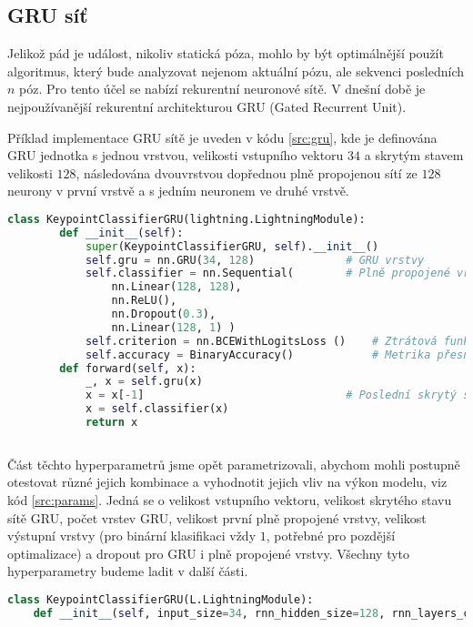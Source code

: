 \subsection{GRU síť}

Jelikož pád je událost, nikoliv statická póza, mohlo by být optimálnější použít
algoritmus, který bude analyzovat nejenom aktuální pózu, ale sekvenci
posledních $n$ póz. Pro tento účel se nabízí rekurentní neuronové sítě. V
dnešní době je nejpoužívanější rekurentní architekturou GRU (Gated Recurrent
Unit).

Příklad implementace GRU sítě je uveden v kódu \ref{src:gru}, kde je definována
GRU jednotka s jednou vrstvou, velikosti vstupního vektoru $34$ a skrytým
stavem velikosti $128$, následována dvouvrstvou dopřednou plně propojenou sítí
ze $128$ neurony v první vrstvě a s jedním neuronem ve druhé vrstvě.

\begin{lstlisting}[language=Python, label=src:gru, caption={Ukázka implementace GRU sítě v PyTorch Lightning}]
    class KeypointClassifierGRU(lightning.LightningModule):
        def __init__(self):
            super(KeypointClassifierGRU, self).__init__()
            self.gru = nn.GRU(34, 128)              # GRU vrstvy
            self.classifier = nn.Sequential(        # Plně propojené vrstvy
                nn.Linear(128, 128),
                nn.ReLU(),
                nn.Dropout(0.3),
                nn.Linear(128, 1) )
            self.criterion = nn.BCEWithLogitsLoss ()    # Ztrátová funkce
            self.accuracy = BinaryAccuracy()            # Metrika přesnosti
        def forward(self, x):
            _, x = self.gru(x)
            x = x[-1]                               # Poslední skrytý stav
            x = self.classifier(x)
            return x
    
\end{lstlisting}

Část těchto hyperparametrů jsme opět parametrizovali, abychom mohli postupně
otestovat různé jejich kombinace a vyhodnotit jejich vliv na výkon modelu, viz
kód \ref{src:params}. Jedná se o velikost vstupního vektoru, velikost skrytého
stavu sítě GRU, počet vrstev GRU, velikost první plně propojené vrstvy,
velikost výstupní vrstvy (pro binární klasifikaci vždy $1$, potřebné pro
pozdější optimalizace) a dropout pro GRU i plně propojené vrstvy. Všechny tyto
hyperparametry budeme ladit v další části.

\begin{lstlisting}[language=Python, label=src:params, caption={Parametry konstruktoru třídy $KeypointClassifierGRU$ definující hyperparametry sítě}]
class KeypointClassifierGRU(L.LightningModule):
    def __init__(self, input_size=34, rnn_hidden_size=128, rnn_layers_count=2, fc_size=128, output_size=1, rnn_dropout=0.3, fc_dropout=0.3, device=None):
\end{lstlisting}

